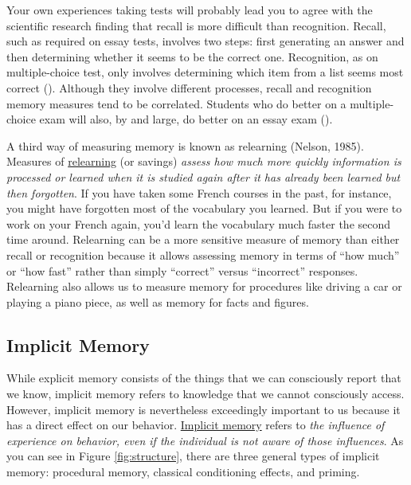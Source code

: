 \documentclass[
]{krantz}
\begin{document}
Your own experiences taking tests will probably lead you to agree with the scientific research finding that recall is more difficult than recognition. Recall, such as required on essay tests, involves two steps: first generating an answer and then determining whether it seems to be the correct one. Recognition, as on multiple-choice test, only involves determining which item from a list seems most correct (). Although they involve different processes, recall and recognition memory measures tend to be correlated. Students who do better on a multiple-choice exam will also, by and large, do better on an essay exam ().

A third way of measuring memory is known as relearning (Nelson, 1985). Measures of \hyperref[relearning]{relearning} (or savings) \emph{assess how much more quickly information is processed or learned when it is studied again after it has already been learned but then forgotten}. If you have taken some French courses in the past, for instance, you might have forgotten most of the vocabulary you learned. But if you were to work on your French again, you'd learn the vocabulary much faster the second time around. Relearning can be a more sensitive measure of memory than either recall or recognition because it allows assessing memory in terms of ``how much'' or ``how fast'' rather than simply ``correct'' versus ``incorrect'' responses. Relearning also allows us to measure memory for procedures like driving a car or playing a piano piece, as well as memory for facts and figures.

\subsection*{Implicit Memory}\label{implicit-memory}


While explicit memory consists of the things that we can consciously report that we know, implicit memory refers to knowledge that we cannot consciously access. However, implicit memory is nevertheless exceedingly important to us because it has a direct effect on our behavior. \hyperref[implicit-memory]{Implicit memory} refers to \emph{the influence of experience on behavior, even if the individual is not aware of those influences}. As you can see in Figure \ref{fig:structure}, there are three general types of implicit memory: procedural memory, classical conditioning effects, and priming.
\end{document}
